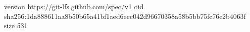 version https://git-lfs.github.com/spec/v1
oid sha256:1da888611aa8b50b65a41bf1aed6ecc042d96670358a58b5bb75fc76c2b4063f
size 531

